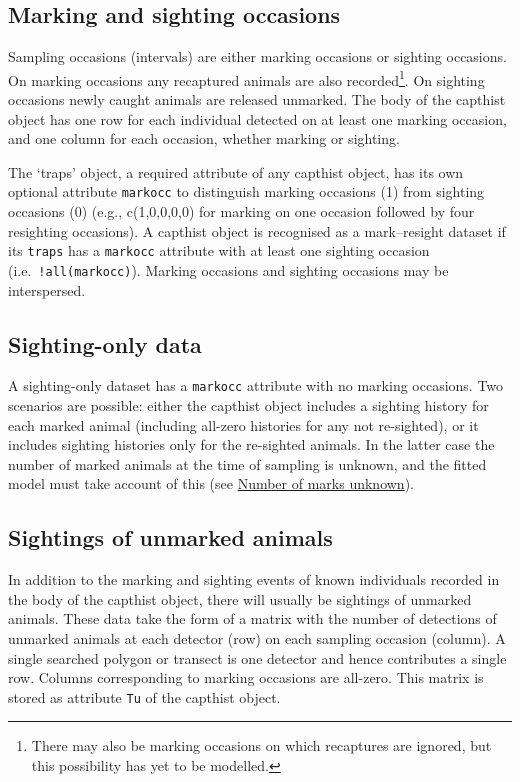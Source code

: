 \documentclass[
]{book}
\begin{document}
\subsection{Marking and sighting occasions}\label{marking-and-sighting-occasions}

Sampling occasions (intervals) are either marking occasions or sighting occasions. On marking occasions any recaptured animals are also recorded\footnote{There may also be marking occasions on which recaptures are ignored, but this possibility has yet to be modelled.}. On sighting occasions newly caught animals are released unmarked. The body of the capthist object has one row for each individual detected on at least one marking occasion, and one column for each occasion, whether marking or sighting.

The `traps' object, a required attribute of any capthist object, has its own optional attribute \texttt{markocc} to distinguish marking occasions (1) from sighting occasions (0) (e.g., c(1,0,0,0,0) for marking on one occasion followed by four resighting occasions). A capthist object is recognised as a mark--resight dataset if its \texttt{traps} has a \texttt{markocc} attribute with at least one sighting occasion (i.e.~\texttt{!all(markocc)}). Marking occasions and sighting occasions may be interspersed.

\subsection{Sighting-only data}\label{sighting-only-data}

A sighting-only dataset has a \texttt{markocc} attribute with no marking occasions. Two scenarios are possible: either the capthist object includes a sighting history for each marked animal (including all-zero histories for any not re-sighted), or it includes sighting histories only for the re-sighted animals. In the latter case the number of marked animals at the time of sampling is unknown, and the fitted model must take account of this (see \hyperref[unknownmarked]{Number of marks unknown}).

\subsection{Sightings of unmarked animals}\label{sightings-of-unmarked-animals}

In addition to the marking and sighting events of known individuals recorded in the body of the capthist object, there will usually be sightings of unmarked animals. These data take the form of a matrix with the number of detections of unmarked animals at each detector (row) on each sampling occasion (column). A single searched polygon or transect is one detector and hence contributes a single row. Columns corresponding to marking occasions are all-zero. This matrix is stored as attribute \texttt{Tu} of the capthist object.
\end{document}
